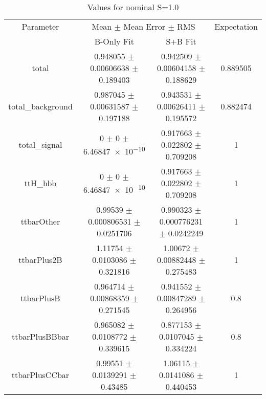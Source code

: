 \begin{table}
\centering
\caption{Values for nominal S=1.0}
\begin{tabular}{cccc}
\toprule
Parameter & \multicolumn{2}{c}{Mean $\pm$ Mean Error $\pm$ RMS} & Expectation\\
 & B-Only Fit & S+B Fit & \\
\midrule
total & \num{0.948055} $\pm$ \num{0.00606638} $\pm$ \num{0.189403} & \num{0.942509} $\pm$ \num{0.00604158} $\pm$ \num{0.188629} & \num{0.889505}\\
total\_background & \num{0.987045} $\pm$ \num{0.00631587} $\pm$ \num{0.197188} & \num{0.943531} $\pm$ \num{0.00626411} $\pm$ \num{0.195572} & \num{0.882474}\\
total\_signal & \num{0} $\pm$ \num{0} $\pm$ \num{6.46847e-10} & \num{0.917663} $\pm$ \num{0.022802} $\pm$ \num{0.709208} & \num{1}\\
ttH\_hbb & \num{0} $\pm$ \num{0} $\pm$ \num{6.46847e-10} & \num{0.917663} $\pm$ \num{0.022802} $\pm$ \num{0.709208} & \num{1}\\
ttbarOther & \num{0.99539} $\pm$ \num{0.000806531} $\pm$ \num{0.0251706} & \num{0.990323} $\pm$ \num{0.000776231} $\pm$ \num{0.0242249} & \num{1}\\
ttbarPlus2B & \num{1.11754} $\pm$ \num{0.0103086} $\pm$ \num{0.321816} & \num{1.00672} $\pm$ \num{0.00882448} $\pm$ \num{0.275483} & \num{1}\\
ttbarPlusB & \num{0.964714} $\pm$ \num{0.00868359} $\pm$ \num{0.271545} & \num{0.941552} $\pm$ \num{0.00847289} $\pm$ \num{0.264956} & \num{0.8}\\
ttbarPlusBBbar & \num{0.965082} $\pm$ \num{0.0108772} $\pm$ \num{0.339615} & \num{0.877153} $\pm$ \num{0.0107045} $\pm$ \num{0.334224} & \num{0.8}\\
ttbarPlusCCbar & \num{0.99551} $\pm$ \num{0.0139291} $\pm$ \num{0.43485} & \num{1.06115} $\pm$ \num{0.0141086} $\pm$ \num{0.440453} & \num{1}\\
\bottomrule
\end{tabular}
\end{table}